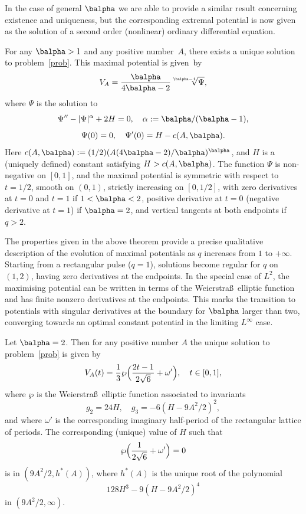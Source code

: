 In the case of general $\balpha$ we are able to provide a similar result concerning existence and uniqueness, but the corresponding
extremal potential is now given as the solution of a second order (nonlinear) ordinary differential equation.

\begin{thmx} \label{thm2}
For any $\balpha>1$ and any positive number~$A$, there exists a unique solution to problem~\eqref{prob}.
This maximal potential is given~by
\[
V_{A} = \frac{\balpha}{4\balpha-2}\sqrt[\balpha-1]{\Psi},
\]
where $\Psi$ is the solution to
\[
\Psi''-|\Psi|^\alpha+2H = 0,\quad \alpha:=\balpha/(\balpha-1),
\]
\[
\Psi(0)=0,\quad \Psi'(0)=H-c(A,\balpha).
\]
Here $c(A,\balpha):=(1/2)(A(4\balpha-2)/\balpha)^\balpha$, and $H$ is a
(uniquely defined) constant satisfying $H>c(A,\balpha)$.
The function $\Psi$ is non-negative on $[0,1]$, and
the maximal potential is symmetric with respect to $t=1/2$, smooth on $(0,1)$,
strictly increasing on $[0,1/2]$,
with zero derivatives at $t=0$ and $t=1$ if $1<\balpha<2$, positive derivative at $t=0$
(\resp negative derivative at $t=1$) if $\balpha=2$, and vertical tangents at both
endpoints if $q>2$.
\end{thmx}

The properties given in the above theorem provide a precise qualitative description of the evolution of maximal potentials as
$q$ increases from $1$ to $+\infty$. Starting from a rectangular pulse ($q=1$), solutions become regular for $q$ on $(1,2)$, having
zero derivatives at the endpoints. In the special case of $L^{2}$, the maximising
potential can be written in terms of the Weierstra\ss\ elliptic function
and has finite nonzero derivatives at the endpoints. This marks the transition to potentials with singular derivatives at the boundary
for $\balpha$ larger than two, converging towards an optimal constant potential in the limiting $L^{\infty}$ case.

\begin{thmx} \label{thm3}
Let $\balpha=2$. Then for any positive number $A$ the unique solution to problem~\eqref{prob}
is given by
\[
V_A(t) = \frac{1}{3}\wp\Bigl(\frac{2t-1}{2\sqrt{6}}+\omega'\Bigr),\quad t \in [0,1],
\]
where $\wp$ is the Weierstra\ss\ elliptic function associated to invariants
\[
g_2 = 24 H,\quad g_3 = -6(H-9A^2/2)^2,
\]
and where $\omega'$ is the corresponding
imaginary half-period of the rectangular lattice of
periods. The corresponding (unique) value of $H$ such that
\[
\wp\Bigl(\frac{1}{2\sqrt{6}}+\omega'\Bigr) = 0
\]
is in $(9A^2/2,h^*(A))$, where $h^*(A)$ is the unique root of the polynomial
\[
128 H^3-9(H-9A^2/2)^4
\]
in $(9A^2/2,\infty)$.
\end{thmx}

